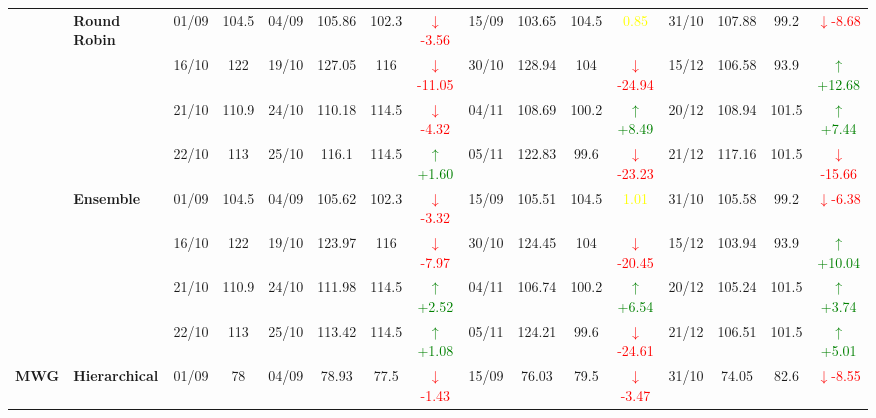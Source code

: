 \documentclass{ieeeaccess}
\begin{document}
{\begin{longtable}{llcc|cccc|cccc|cccc}
& \textbf{Round Robin}
& 01/09 & 104.5 & 04/09 & 105.86 & 102.3 & \textcolor{red}{\(\downarrow\)-3.56} & 15/09 & 103.65 & 104.5 & \textcolor{yellow}{0.85} & 31/10 & 107.88 & 99.2 & \textcolor{red}{\(\downarrow\)-8.68} \\

&
& 16/10 & 122 & 19/10 & 127.05 & 116 & \textcolor{red}{\(\downarrow\)-11.05} & 30/10 & 128.94 & 104 & \textcolor{red}{\(\downarrow\)-24.94} & 15/12 & 106.58 & 93.9 & \textcolor{green}{\(\uparrow\)+12.68} \\

&
& 21/10 & 110.9 & 24/10 & 110.18 & 114.5 & \textcolor{red}{\(\downarrow\)-4.32} & 04/11 & 108.69 & 100.2 & \textcolor{green}{\(\uparrow\)+8.49} & 20/12 & 108.94 & 101.5 & \textcolor{green}{\(\uparrow\)+7.44} \\

&
& 22/10 & 113 & 25/10 & 116.1 & 114.5 & \textcolor{green}{\(\uparrow\)+1.60} & 05/11 & 122.83 & 99.6 & \textcolor{red}{\(\downarrow\)-23.23} & 21/12 & 117.16 & 101.5 & \textcolor{red}{\(\downarrow\)-15.66} \\
\cmidrule(lr){2-16}


& \textbf{Ensemble}
& 01/09 & 104.5 & 04/09 & 105.62 & 102.3 & \textcolor{red}{\(\downarrow\)-3.32} & 15/09 & 105.51 & 104.5 & \textcolor{yellow}{1.01} & 31/10 & 105.58 & 99.2 & \textcolor{red}{\(\downarrow\)-6.38} \\

&
& 16/10 & 122 & 19/10 & 123.97 & 116 & \textcolor{red}{\(\downarrow\)-7.97} & 30/10 & 124.45 & 104 & \textcolor{red}{\(\downarrow\)-20.45} & 15/12 & 103.94 & 93.9 & \textcolor{green}{\(\uparrow\)+10.04} \\

&
& 21/10 & 110.9 & 24/10 & 111.98 & 114.5 & \textcolor{green}{\(\uparrow\)+2.52} & 04/11 & 106.74 & 100.2 & \textcolor{green}{\(\uparrow\)+6.54} & 20/12 & 105.24 & 101.5 & \textcolor{green}{\(\uparrow\)+3.74} \\

&
& 22/10 & 113 & 25/10 & 113.42 & 114.5 & \textcolor{green}{\(\uparrow\)+1.08} & 05/11 & 124.21 & 99.6 & \textcolor{red}{\(\downarrow\)-24.61} & 21/12 & 106.51 & 101.5 & \textcolor{green}{\(\uparrow\)+5.01} \\
\midrule




\multirow{12}{*}{\textbf{MWG}} 
& \textbf{Hierarchical}
& 01/09 & 78 & 04/09 & 78.93 & 77.5 & \textcolor{red}{\(\downarrow\)-1.43} & 15/09 & 76.03 & 79.5 & \textcolor{red}{\(\downarrow\)-3.47} & 31/10 & 74.05 & 82.6 & \textcolor{red}{\(\downarrow\)-8.55} \\


\end{longtable}}
\end{document}
